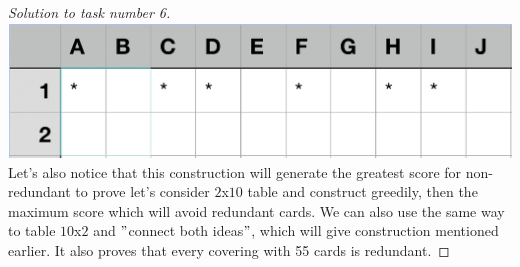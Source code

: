 \documentclass[12pt,a4paper]{article}
\begin{document}
\begin{proof}[Solution to task number 6]
 \includegraphics[scale=0.4]{ko}\\
 Let's also notice that this construction will generate the greatest score for non-redundant to prove let's consider $2$x$10$ table and construct greedily, 
then the maximum score which will avoid redundant cards. We can also use the same way to table $10$x$2$ and $"$connect both ideas$"$, which will give construction mentioned earlier.
 It also proves that every covering with 55 cards is redundant.
\end{proof}
\end{document}

